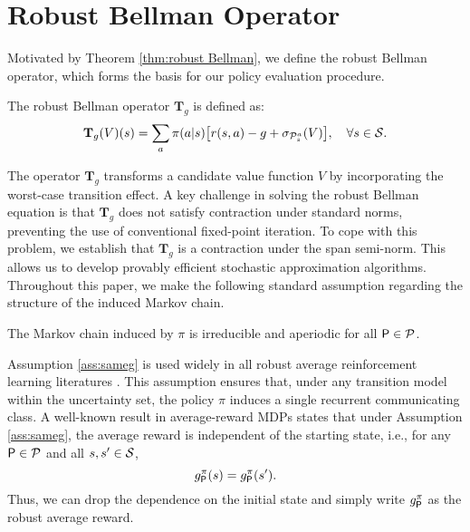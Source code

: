 \section{Robust Bellman Operator}

Motivated by Theorem \ref{thm:robust Bellman}, we define the robust Bellman operator, which forms the basis for our policy evaluation procedure.

\begin{definition}
The robust Bellman operator $\mathbf{T}_g$ is defined as:
\begin{equation} \label{eq:bellmanoperator}
    \mathbf{T}_g(V)(s) = \sum_{a} \pi(a|s) \big[ r(s,a) - g +  \sigma_{\mathcal{P}^a_s}(V) \big], \quad \forall s \in \mathcal{S}.
\end{equation}
\end{definition}

The operator $\mathbf{T}_g$ transforms a candidate value function $V$ by incorporating the worst-case transition effect. A key challenge in solving the robust Bellman equation is that $\mathbf{T}_g$ does not satisfy contraction under standard norms, preventing the use of conventional fixed-point iteration. To cope with this problem, we establish that $\mathbf{T}_g$ is a contraction under the span semi-norm. This allows us to develop provably efficient stochastic approximation algorithms. Throughout this paper, we make the following standard assumption regarding the structure of the induced Markov chain.

\begin{assumption}\label{ass:sameg}
    The Markov chain induced by $\pi$ is irreducible and aperiodic for all $\mathsf P\in\mathcal{P}$. 
\end{assumption}

Assumption \ref{ass:sameg} is used widely in all robust average reinforcement learning literatures \citep{wang2023robust, wang2023model, wang2024robust,sunpolicy2024}. This assumption ensures that, under any transition model within the uncertainty set, the policy $\pi$ induces a single recurrent communicating class. A well-known result in average-reward MDPs states that under Assumption \ref{ass:sameg}, the average reward is independent of the starting state, i.e., for any $\mathsf P\in\mathcal{P}$ and all $s,s' \in \mathcal{S}$,  
\begin{equation}
    g^\pi_\mathsf P(s) = g^\pi_\mathsf P(s').
\end{equation}
Thus, we can drop the dependence on the initial state and simply write $g^\pi_\mathsf P$ as the robust average reward.

